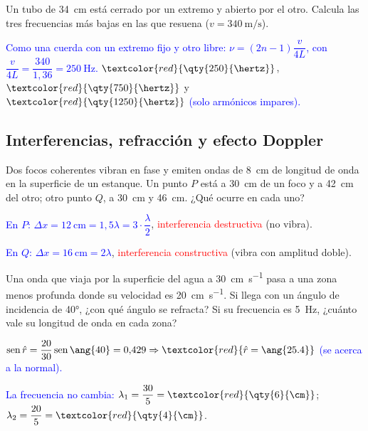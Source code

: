 \begin{exercise}
    Un tubo de \qty{34}{\cm} está cerrado por un extremo y abierto por el otro. Calcula las tres frecuencias más bajas en
    las que resuena (\(v = \qty{340}{\m\per\second}\)).
    \begin{solu}
        \textcolor{blue}{Como una cuerda con un extremo fijo y otro libre: \(\nu = (2n - 1)\dfrac{v}{4L}\), con \(\dfrac{v}{4L} = \dfrac{340}{1{,}36} = \qty{250}{\hertz}\).}
        \(\textcolor{red}{\qty{250}{\hertz}}\), \(\textcolor{red}{\qty{750}{\hertz}}\) y \(\textcolor{red}{\qty{1250}{\hertz}}\) \textcolor{blue}{(solo armónicos impares).}
    \end{solu}
\end{exercise}

\subsection{Interferencias, refracción y efecto Doppler}

\begin{exercise}
    Dos focos coherentes vibran en fase y emiten ondas de \qty{8}{\cm} de longitud de onda en la superficie de un estanque.
    Un punto \(P\) está a \qty{30}{\cm} de un foco y a \qty{42}{\cm} del otro; otro punto \(Q\), a \qty{30}{\cm} y \qty{46}{\cm}.
    ¿Qué ocurre en cada uno?
    \begin{solu}
        \textcolor{blue}{En \(P\): \(\Delta x = \qty{12}{\cm} = 1{,}5\lambda = 3\cdot\dfrac{\lambda}{2}\)}, \textcolor{red}{interferencia destructiva} (no vibra).

        \textcolor{blue}{En \(Q\): \(\Delta x = \qty{16}{\cm} = 2\lambda\)}, \textcolor{red}{interferencia constructiva} (vibra con amplitud doble).
    \end{solu}
\end{exercise}

\begin{exercise}
    Una onda que viaja por la superficie del agua a \qty{30}{\cm\per\second} pasa a una zona menos profunda donde su velocidad
    es \qty{20}{\cm\per\second}. Si llega con un ángulo de incidencia de \ang{40}, ¿con qué ángulo se refracta? Si su
    frecuencia es \qty{5}{\hertz}, ¿cuánto vale su longitud de onda en cada zona?
    \begin{solu}
        \(\sen\hat r = \dfrac{20}{30}\sen\ang{40} = 0{,}429 \Rightarrow \textcolor{red}{\hat r = \ang{25.4}}\) \textcolor{blue}{(se acerca a la normal).}

        \textcolor{blue}{La frecuencia no cambia:} \(\lambda_1 = \dfrac{30}{5} = \textcolor{red}{\qty{6}{\cm}}\); \(\lambda_2 = \dfrac{20}{5} = \textcolor{red}{\qty{4}{\cm}}\).
    \end{solu}
\end{exercise}

